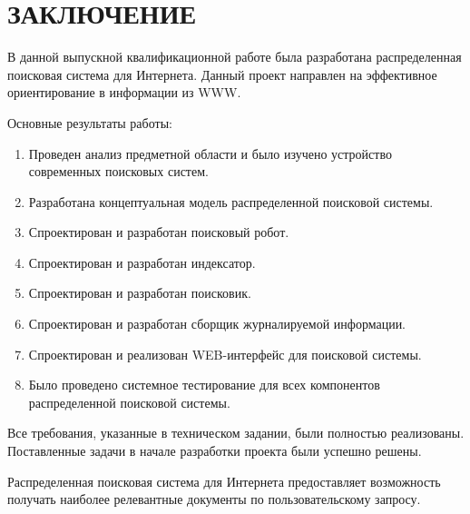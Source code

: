 \section{ЗАКЛЮЧЕНИЕ}

В данной выпускной квалификационной работе была разработана распределенная поисковая система для Интернета. Данный проект направлен на эффективное ориентирование в информации из WWW.

Основные результаты работы:

\begin{enumerate}
	\item Проведен анализ предметной области и было изучено устройство современных поисковых систем.
	\item Разработана концептуальная модель распределенной поисковой системы.
	\item Спроектирован и разработан поисковый робот.
	\item Спроектирован и разработан индексатор.
	\item Спроектирован и разработан поисковик.
	\item Спроектирован и разработан сборщик журналируемой информации.
	\item Спроектирован и реализован WEB-интерфейс для поисковой системы.
	\item Было проведено системное тестирование для всех компонентов распределенной поисковой системы.
\end{enumerate}

Все требования, указанные в техническом задании, были полностью реализованы. Поставленные задачи в начале разработки проекта были успешно решены.
	
Распределенная поисковая система для Интернета предоставляет возможность получать наиболее релевантные документы по пользовательскому запросу.